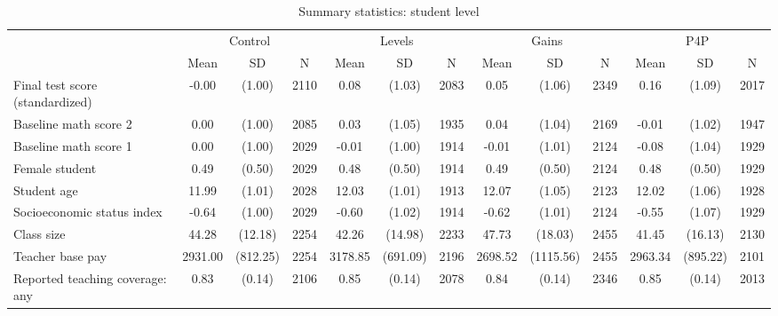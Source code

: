 \begin{table}[htbp]\centering
\def\sym#1{\ifmmode^{#1}\else\(^{#1}\)\fi}
\caption{Summary statistics: student level}
\begin{tabular}{l*{4}{ccc}}
\hline\hline
                    &\multicolumn{3}{c}{Control}           &\multicolumn{3}{c}{Levels}            &\multicolumn{3}{c}{Gains}             &\multicolumn{3}{c}{P4P}               \\
                    &        Mean&          SD&           N&        Mean&          SD&           N&        Mean&          SD&           N&        Mean&          SD&           N\\
\hline
Final test score (standardized)&       -0.00&      (1.00)&        2110&        0.08&      (1.03)&        2083&        0.05&      (1.06)&        2349&        0.16&      (1.09)&        2017\\
Baseline math score 2&        0.00&      (1.00)&        2085&        0.03&      (1.05)&        1935&        0.04&      (1.04)&        2169&       -0.01&      (1.02)&        1947\\
Baseline math score 1&        0.00&      (1.00)&        2029&       -0.01&      (1.00)&        1914&       -0.01&      (1.01)&        2124&       -0.08&      (1.04)&        1929\\
Female student      &        0.49&      (0.50)&        2029&        0.48&      (0.50)&        1914&        0.49&      (0.50)&        2124&        0.48&      (0.50)&        1929\\
Student age         &       11.99&      (1.01)&        2028&       12.03&      (1.01)&        1913&       12.07&      (1.05)&        2123&       12.02&      (1.06)&        1928\\
Socioeconomic status index&       -0.64&      (1.00)&        2029&       -0.60&      (1.02)&        1914&       -0.62&      (1.01)&        2124&       -0.55&      (1.07)&        1929\\
Class size          &       44.28&     (12.18)&        2254&       42.26&     (14.98)&        2233&       47.73&     (18.03)&        2455&       41.45&     (16.13)&        2130\\
Teacher base pay    &     2931.00&    (812.25)&        2254&     3178.85&    (691.09)&        2196&     2698.52&   (1115.56)&        2455&     2963.34&    (895.22)&        2101\\
Reported teaching coverage: any&        0.83&      (0.14)&        2106&        0.85&      (0.14)&        2078&        0.84&      (0.14)&        2346&        0.85&      (0.14)&        2013\\

\end{tabular}
\end{table}
